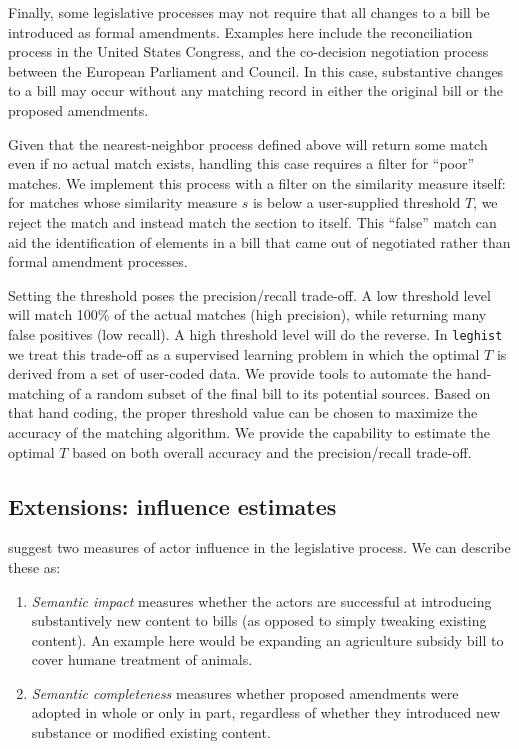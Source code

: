 \documentclass[11pt]{article}
\begin{document}
Finally, some legislative processes may not require that all changes
to a bill be introduced as formal amendments. Examples here include the
reconciliation process in the United States Congress, and the
co-decision negotiation process between the European Parliament and Council. In
this case, substantive changes to a bill may occur without any
matching record in either the original bill or the proposed
amendments. 

Given that the nearest-neighbor process defined above will return some
match even if no actual match exists, handling this case requires a
filter for ``poor'' matches. We implement this process with a filter
on the similarity measure itself: for matches whose similarity
measure $s$ is below a user-supplied threshold $T$, we reject the
match and instead match the section to itself. This ``false'' match
can aid the identification of elements in a bill that
came out of negotiated rather than formal amendment processes. 

Setting the threshold poses the precision/recall trade-off. A low
threshold level will match 100\% of the actual matches (high
precision), while returning many false positives (low recall). A high
threshold level will do the reverse. In \texttt{leghist} we treat this
trade-off as a supervised learning problem in which the optimal $T$ is
derived from a set of user-coded data. We provide tools to automate
the hand-matching of a random subset of the final bill to its
potential sources. Based on that hand coding, the proper threshold
value can be chosen to maximize the accuracy of the matching
algorithm. We provide the capability to estimate the optimal $T$ based
on both overall accuracy and the precision/recall trade-off.

\subsection{Extensions: influence estimates}
\label{sec:extens-infl-estim}

\cite{tsebelis2001legislative} suggest two measures of actor influence
in the legislative process. We can describe these as:

\begin{enumerate}
\item \textit{Semantic impact} measures whether the actors are
  successful at introducing substantively new content to bills (as
  opposed to simply tweaking existing content). An example here would
  be expanding an agriculture subsidy bill to cover humane treatment
  of animals.
\item \textit{Semantic completeness} measures whether proposed
  amendments were adopted in whole or only in part, regardless of
  whether they introduced new substance or modified existing content.
\end{enumerate}
\end{document}
